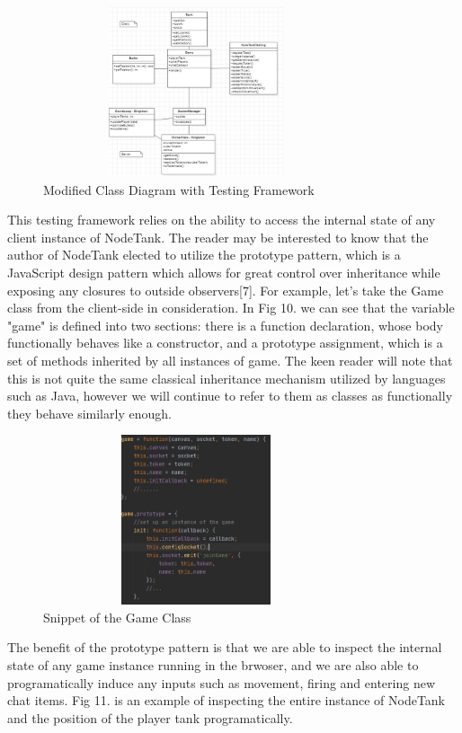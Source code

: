 \documentclass[conference]{IEEEtran}
\begin{document}
\begin{figure}[htbp]
\centerline{\includegraphics [width = 9cm, height = 5cm] {ClassDiagramWithTesting.jpg}}
\caption{Modified Class Diagram with Testing Framework}
\end{figure}

This testing framework relies on the ability to access the internal state of any client instance of NodeTank. The reader may be interested to know that the author of NodeTank 
elected to utilize the prototype pattern, which is a JavaScript design pattern which allows for great control over inheritance while exposing any closures to outside observers[7]. For example, 
let's take the Game class from the client-side in consideration. In Fig 10. we can see that the variable "game" is defined into two sections: there is a function declaration, whose body functionally 
behaves like a constructor, and a prototype assignment, which is a set of methods inherited by all instances of game. The keen reader will note that this is not quite the same classical inheritance
mechanism utilized by languages such as Java, however we will continue to refer to them as classes as functionally they behave similarly enough.

\begin{figure}[htbp]
\centerline{\includegraphics [width = 9cm, height = 5cm] {GameCodeSnippet.jpg}}
\caption{Snippet of the Game Class}
\end{figure}

The benefit of the prototype pattern is that we are able to inspect the internal state of any game instance running in the brwoser, and we are also able to programatically induce 
any inputs such as movement, firing and entering new chat items. Fig 11. is an example of inspecting the entire instance of NodeTank and the position of the player tank programatically.
\end{document}
